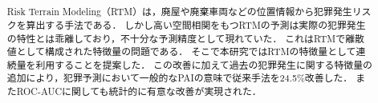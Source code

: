 \usepackage{color}
\usepackage{url}
\usepackage{doi}
\usepackage{lmodern}
\usepackage{amsmath}
\usepackage{mathtools}
\usepackage{amsthm}
\usepackage{amssymb}
\usepackage{booktabs}
\usepackage[dvipdfmx]{graphicx}
\usepackage{listings}
\usepackage{float} 
\usepackage{placeins}
\usepackage[nameinlink]{cleveref}
\usepackage{subcaption}

\usepackage{lipsum}

\let\OLDthebibliography\thebibliography
\renewcommand\thebibliography[1]{
  \OLDthebibliography{#1}
  \setlength{\parskip}{0pt}
  \setlength{\itemsep}{0pt plus 0.3ex}
}


\newcommand{\yj}[1]{{#1}^{(\lambda)}}
\newcommand{\yjj}[1]{{#1}^{(\lambda_j)}}
\newcommand{\yjs}[1]{{#1}^{(\lambda*)}}
\newcommand{\tr}[1]{{#1}^\top}
\newcommand{\yjv}{\xi}
\newcommand{\real}{\mathbb{R}}
\newcommand{\cfsq}{$\text{CF}^2$}

\title{
}


\author{%
\and
{}
}



\begin{abstract}
Risk Terrain Modeling（RTM）は，廃屋や廃棄車両などの位置情報から犯罪発生リスクを算出する手法である．
しかし高い空間相関をもつRTMの予測は実際の犯罪発生の特性とは乖離しており，不十分な予測精度として現れていた．
これはRTMで離散値として構成された特徴量の問題である．
そこで本研究ではRTMの特徴量として連続量を利用することを提案した．
この改善に加えて過去の犯罪発生に関する特徴量の追加により，犯罪予測において一般的なPAIの意味で従来手法を24.5\%改善した．
またROC-AUCに関しても統計的に有意な改善が実現された．
\end{abstract}


